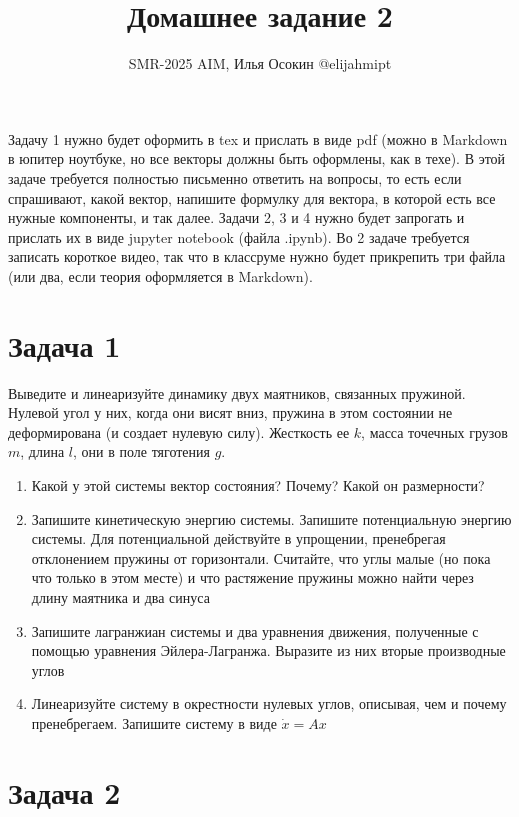 \documentclass{article}
\begin{document}
\title{Домашнее задание 2}
\date{}
\author{SMR-2025 AIM, Илья Осокин @elijahmipt} %
\maketitle

Задачу 1 нужно будет оформить в tex и прислать в виде pdf (можно в Markdown в юпитер ноутбуке, но все векторы должны быть оформлены, как в техе).
В этой задаче требуется полностью письменно ответить на вопросы, то есть если спрашивают, какой вектор, напишите формулку для вектора, в которой есть все нужные компоненты, и так далее.
Задачи 2, 3 и 4 нужно будет запрогать и прислать их в виде jupyter notebook (файла .ipynb).
Во 2 задаче требуется записать короткое видео, так что в классруме нужно будет прикрепить три файла (или два, если теория оформляется в Markdown).

\section*{Задача 1}

Выведите и линеаризуйте динамику двух маятников, связанных пружиной.
Нулевой угол у них, когда они висят вниз, пружина в этом состоянии не деформирована (и создает нулевую силу).
Жесткость ее $k$, масса точечных грузов $m$, длина $l$, они в поле тяготения $g$.

\begin{enumerate}
    \item Какой у этой системы вектор состояния? Почему? Какой он размерности?
    \item Запишите кинетическую энергию системы. Запишите потенциальную энергию системы. Для потенциальной действуйте в упрощении, пренебрегая отклонением пружины от горизонтали. Считайте, что углы малые (но пока что только в этом месте) и что растяжение пружины можно найти через длину маятника и два синуса
    \item Запишите лагранжиан системы и два уравнения движения, полученные с помощью уравнения Эйлера-Лагранжа. Выразите из них вторые производные углов
    \item Линеаризуйте систему в окрестности нулевых углов, описывая, чем и почему пренебрегаем. Запишите систему в виде $\dot{x} = A x$
\end{enumerate}

\section*{Задача 2}
\end{document}
